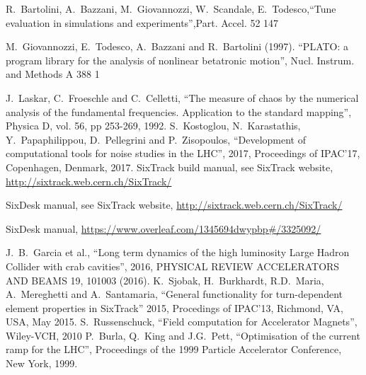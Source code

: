\begin{thebibliography}{99}
     R.~Bartolini, A.~Bazzani, M.~Giovannozzi, W.~Scandale, E.~Todesco,``Tune evaluation in simulations and experiments'',Part. Accel. 52 147
    
     M.~Giovannozzi, E.~Todesco, A.~Bazzani and R.~Bartolini (1997). ``PLATO: a program library for the analysis of nonlinear betatronic motion'', Nucl. Instrum. and Methods A 388 1
    
     J.~Laskar, C.~Froeschle and C.~Celletti,
      ``The measure of chaos by the numerical analysis of the fundamental frequencies. Application to the standard mapping'', 
      Physica D, vol. 56, pp 253-269, 1992.
     S.~Kostoglou, N.~Karastathis, Y.~Papaphilippou, D.~Pellegrini and P.~Zisopoulos,
      ``Development of computational tools for noise studies in the LHC'', 
      2017, Proceedings of IPAC'17, Copenhagen, Denmark, 2017.
     SixTrack build manual, see SixTrack website, \url{http://sixtrack.web.cern.ch/SixTrack/}
    
     SixDesk manual, see SixTrack website, \url{http://sixtrack.web.cern.ch/SixTrack/}
    
     SixDesk manual, \url{https://www.overleaf.com/1345694dwypbp#/3325092/}
    
     J.~B.~Garcia et al., 
    ``Long term dynamics of the high luminosity Large Hadron Collider with crab cavities'',
    2016, PHYSICAL REVIEW ACCELERATORS AND BEAMS 19, 101003 (2016).
     K.~Sjobak, H.~Burkhardt, R.D.~Maria, A.~Mereghetti and A.~Santamaria,
      ``General functionality for turn-dependent element properties in SixTrack''
      2015, Procedings of IPAC'13, Richmond, VA, USA, May 2015.
     S.~Russenschuck,
      ``Field computation for Accelerator Magnets'',
      Wiley-VCH, 2010
     P.~Burla, Q.~King and J.G.~Pett,
      ``Optimisation of the current ramp for the LHC'',
      Proceedings of the 1999 Particle Accelerator Conference, New York, 1999.
      
    
    \end{thebibliography}
    